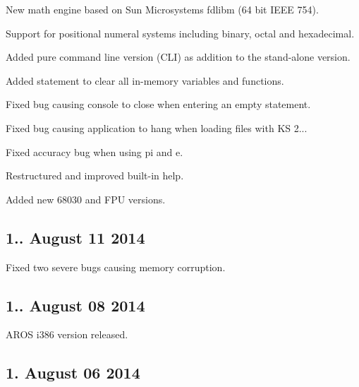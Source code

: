 \begin{DoxyItemize}
\item New math engine based on Sun Microsystems fdlibm (64 bit I\+E\+EE 754).
\item Support for positional numeral systems including binary, octal and hexadecimal.
\item Added pure command line version (C\+LI) as addition to the stand-\/alone version.
\item Added statement to clear all in-\/memory variables and functions.
\item Fixed bug causing console to close when entering an empty statement.
\item Fixed bug causing application to hang when loading files with KS 2...
\item Fixed accuracy bug when using pi and e.
\item Restructured and improved built-\/in help.
\item Added new 68030 and F\+PU versions.
\end{DoxyItemize}\hypertarget{release_page_version132}{}\subsection{1.. August 11 2014}\label{release_page_version132}

\begin{DoxyItemize}
\item Fixed two severe bugs causing memory corruption.
\end{DoxyItemize}\hypertarget{release_page_version131}{}\subsection{1.. August 08 2014}\label{release_page_version131}

\begin{DoxyItemize}
\item A\+R\+OS i386 version released.
\end{DoxyItemize}\hypertarget{release_page_version13}{}\subsection{1. August 06 2014}\label{release_page_version13}

